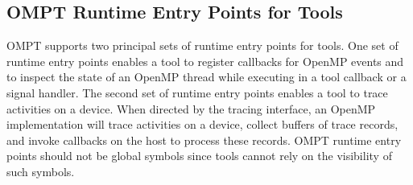 %
%
%
%
%
%
%
%
%
%
%
%
%


\subsection{OMPT Runtime Entry Points for Tools}
\label{sec:entry-points}

OMPT supports two principal sets of runtime entry points for tools. One set of 
runtime entry points enables a tool to register callbacks for OpenMP events and 
to inspect the state of an OpenMP thread while executing in a tool callback or 
a signal handler. The second set of runtime entry points enables a tool to trace 
activities on a device. When directed by the tracing interface, an OpenMP 
implementation will trace activities on a device, collect buffers of trace 
records, and invoke callbacks on the host to process these records. OMPT runtime 
entry points should not be global symbols since tools cannot rely on the 
visibility of such symbols.

